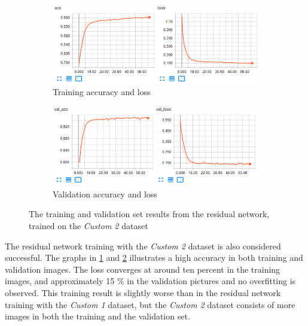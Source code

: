 \documentclass[USenglish]{ifimaster}  %
\begin{document}
\begin{figure}[ht]
\centering
\begin{subfigure}[b]{\textwidth}
\centering
\includegraphics[width=1\textwidth]{bilder/custom_2_training/Custom_2_residual_training_acc_results.png}
\caption{Training accuracy and loss}
\label{fig:custom_2_residual_acc_result}
\end{subfigure}
\hfill
\begin{subfigure}[b]{\textwidth}
\centering
\includegraphics[width=1\textwidth]{bilder/custom_2_training/Custom_2_residual_training_val_acc_results.png}
\caption{Validation accuracy and loss}
\label{fig:custom_2_residual_val_acc_result}
\end{subfigure}
\caption{The training and validation set results from the residual network, trained on the \textit{Custom 2} dataset}
\label{fig:custom_2_residual_result}
\end{figure}

The residual network training with the \textit{Custom 2} dataset is also considered successful. The graphs in \cref{fig:custom_2_residual_acc_result} and \cref{fig:custom_2_residual_val_acc_result} illustrates a high accuracy in both training and validation images. The loss converges at around ten percent in the training images, and approximately 15 \% in the validation pictures and no overfitting is observed. This training result is slightly worse than in the residual network training with the \textit{Custom 1} dataset, but the \textit{Custom 2} dataset consists of more images in both the training and the validation set.
\end{document}
